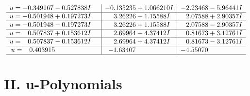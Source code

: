 \documentclass[1p]{elsarticle_modified}
\theoremstyle{definition}
\begin{document}
$$\begin{array}{c|c|c}
\begin{aligned}
u &= -0.349167 - 0.527838 I\end{aligned}
 & -0.135235 + 1.066210 I & -2.23468 - 5.96441 I \\ \hline\begin{aligned}
u &= -0.501948 + 0.197273 I\end{aligned}
 & \phantom{-}3.26226 - 1.15588 I & \phantom{-}2.07588 + 2.90357 I \\ \hline\begin{aligned}
u &= -0.501948 - 0.197273 I\end{aligned}
 & \phantom{-}3.26226 + 1.15588 I & \phantom{-}2.07588 - 2.90357 I \\ \hline\begin{aligned}
u &= \phantom{-}0.507837 + 0.153612 I\end{aligned}
 & \phantom{-}2.69964 - 4.37412 I & \phantom{-}0.81673 + 3.12761 I \\ \hline\begin{aligned}
u &= \phantom{-}0.507837 - 0.153612 I\end{aligned}
 & \phantom{-}2.69964 + 4.37412 I & \phantom{-}0.81673 - 3.12761 I \\ \hline\begin{aligned}
u &= \phantom{-}0.403915\phantom{ +0.000000I}\end{aligned}
 & -1.63407\phantom{ +0.000000I} & -4.55070\phantom{ +0.000000I}\\
 \hline 
 \end{array}$$\newpage
\newpage\renewcommand{\arraystretch}{1}
\centering \section*{ II. u-Polynomials}
\end{document}
